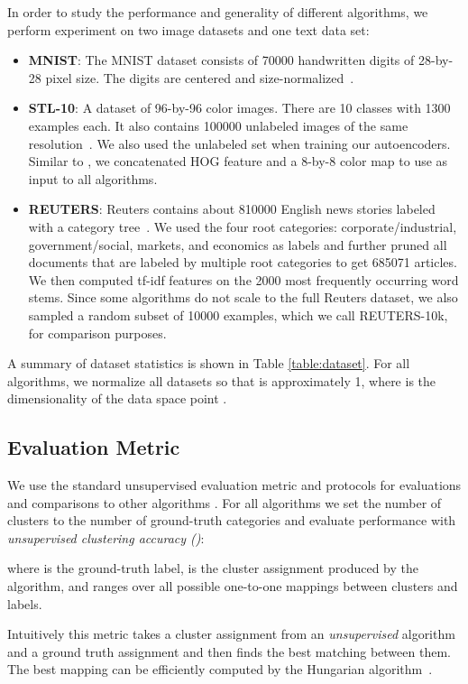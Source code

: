 \documentclass{article}
\begin{document}
In order to study the performance and generality of different algorithms, we perform experiment on two image datasets and one text data set:
\begin{itemize}
\item \textbf{MNIST}: The MNIST dataset consists of 70000 handwritten digits of 28-by-28 pixel size. The digits are centered and size-normalized~\citep{lecun1998gradient}.
\item \textbf{STL-10}: A dataset of 96-by-96 color images. There are 10 classes with 1300 examples each. It also contains 100000 unlabeled images of the same resolution~\citep{coates2011analysis}. We also used the unlabeled set when training our autoencoders. Similar to \citet{doersch2012makes}, we concatenated HOG feature and a 8-by-8 color map to use as input to all algorithms.
\item \textbf{REUTERS}: Reuters contains about 810000 English news stories labeled with a category tree~\citep{lewis2004rcv1}. We used the four root categories: corporate/industrial, government/social, markets, and economics as labels and further pruned all documents that are labeled by multiple root categories to get 685071 articles. We then computed tf-idf features on the 2000 most frequently occurring word stems. Since some algorithms do not scale to the full Reuters dataset, we also sampled a random subset of 10000 examples, which we call REUTERS-10k, for comparison purposes.
\end{itemize}
A summary of dataset statistics is shown in Table \ref{table:dataset}.
For all algorithms, we normalize all datasets so that  is approximately 1, where  is the dimensionality of the data space point .

\subsection{Evaluation Metric}
We use the standard unsupervised evaluation metric and protocols for evaluations and comparisons to other algorithms \cite{yang2010image}.
For all algorithms we set the number of clusters to the number of ground-truth categories and evaluate performance with \emph{unsupervised clustering accuracy ()}:

where  is the ground-truth label,  is the cluster assignment produced by the algorithm, and  ranges over all possible one-to-one mappings between clusters and labels.

Intuitively this metric takes a cluster assignment from an \emph{unsupervised}
algorithm and a ground truth assignment and then finds the best matching between them.
The best mapping can be efficiently computed by the Hungarian algorithm~\citep{kuhn1955hungarian}.
\end{document}
